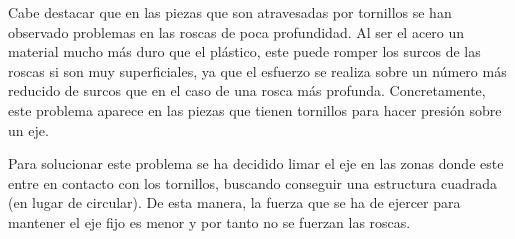 
Cabe destacar que en las piezas que son atravesadas por tornillos se han observado problemas en las roscas de poca profundidad. Al ser el acero un material mucho más duro que el plástico, este puede romper los surcos de las roscas si son muy superficiales, ya que el esfuerzo se realiza sobre un número más reducido de surcos que en el caso de una rosca más profunda. 
Concretamente, este problema aparece en las piezas que tienen tornillos para hacer presión sobre un eje.

Para solucionar este problema se ha decidido limar el eje en las zonas donde este entre en contacto con los tornillos, buscando conseguir una estructura cuadrada (en lugar de circular). De esta manera, la fuerza que se ha de ejercer para mantener el eje fijo es menor y por tanto no se fuerzan las roscas.